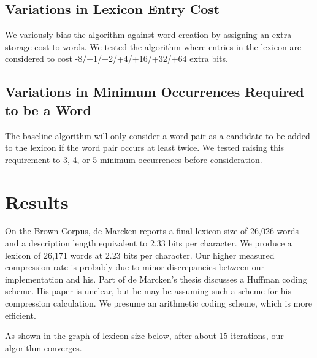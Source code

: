 \documentclass[11pt, oneside, fleqn]{article}
\begin{document}
	\subsection{Variations in Lexicon Entry Cost}
	
	We variously bias the algorithm against word creation by assigning an extra storage cost to words. We tested the algorithm where entries in the lexicon are considered to cost -8/+1/+2/+4/+16/+32/+64 extra bits.

	\subsection{Variations in Minimum Occurrences Required to be a Word}
	
	The baseline algorithm will only consider a word pair as a candidate to be added to the lexicon if the word pair occurs at least twice. We tested raising this requirement to 3, 4, or 5 minimum occurrences before consideration.
 
 \pagebreak
 
   \section{Results}
   
   On the Brown Corpus, de Marcken reports a final lexicon size of 26,026 words and a description length equivalent to 2.33 bits per character. We produce a lexicon of 26,171 words at 2.23 bits per character. Our higher measured compression rate is probably due to minor discrepancies between our implementation and his. Part of de Marcken's thesis discusses a Huffman coding scheme. His paper is unclear, but he may be assuming such a scheme for his compression calculation. We presume an arithmetic coding scheme, which is more efficient.
   
   As shown in the graph of lexicon size below, after about 15 iterations, our algorithm converges.
\end{document}
